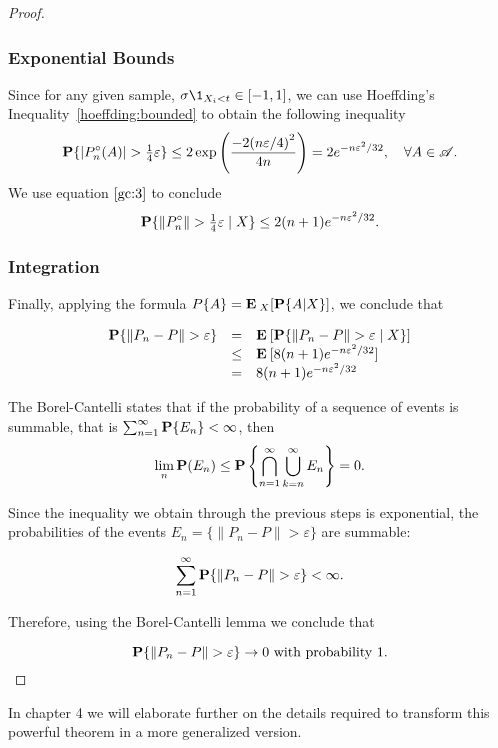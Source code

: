 \begin{proof}
  \subsubsection*{Exponential Bounds}

  Since for any given sample, $\sigma \1_{X_i < t} \in [-1,1]$, we can use Hoeffding's Inequality~\ref{hoeffding:bounded} to obtain the following inequality
  \[ \P \{ |P_n^\circ(A)| > \tfrac{1}{4} \varepsilon \} \leq 2 \exp\left( \frac{-2{(n\varepsilon/4)}^2}{4n}\right) = 2e^{-n\varepsilon^2/32}, \hspace*{1em} \forall A \in \AA.\]
  We use equation $\ref{gc:3}$ to conclude
  \begin{equation} \label{gc:4}
    \P\{ \|P_n^\circ\| > \tfrac{1}{4} \varepsilon \;|\; X\} \leq 2(n+1) e^{-n\varepsilon^2/32}.
  \end{equation} 

  \vspace*{1em}

  \subsubsection*{Integration}

  Finally, applying the formula $P\{A\} = \E_X[\P\{A | X\}]$, we conclude that

  \begin{equation}
    \label{gc:5}\begin{array}{rcl}
      \P \{\|P_n-P\| > \varepsilon\} & = & \E [\P \{\|P_n-P\| > \varepsilon \;|\; X\}]\\
      & \leq & \E [8(n+1) e^{-n\varepsilon^2/32}]\\
      & = & 8(n+1) e^{-n\varepsilon^2/32}
    \end{array} 
  \end{equation}

  The Borel-Cantelli states that if the probability of a sequence of events is summable, that is \(\sum_{n = 1}^\infty \P\{E_n\} < \infty\), then
  \[ \lim_n \P(E_n) \leq \P \left\{ \bigcap_{n=1}^{\infty}\bigcup_{k = n}^{\infty} E_n\right\} = 0. \] 

  Since the inequality we obtain through the previous steps is exponential, the probabilities of the events $E_n = \{\|P_n-P\| > \varepsilon\}$ are summable:

  \[  \sum_{n = 1}^\infty \P \{\|P_n-P\| > \varepsilon\} < \infty .\] 

  Therefore, using the Borel-Cantelli lemma we conclude that

  \[ \P \{\|P_n-P\| > \varepsilon\} \to 0 \mbox{ with probability 1.} \] 
\end{proof}

In chapter 4 we will elaborate further on the details required to transform this powerful theorem in a more generalized version.

